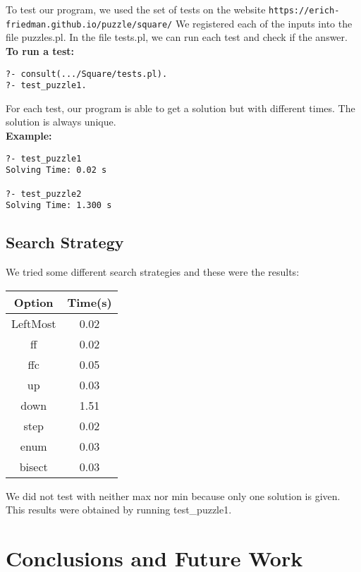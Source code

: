 \documentclass[runningheads]{llncs}
\begin{document}
To test our program, we used the set of tests on the website \texttt{https://erich-friedman.github.io/puzzle/square/} 
We registered each of the inputs into the file puzzles.pl. In the file tests.pl, we can run each test and check if the answer. \\

\textbf{To run a test: }
\begin{verbatim}
?- consult(.../Square/tests.pl).
?- test_puzzle1.
\end{verbatim}

For each test, our program is able to get a solution but with different times. The solution is always unique. \\

\textbf{Example:}
\begin{verbatim}
?- test_puzzle1
Solving Time: 0.02 s

?- test_puzzle2
Solving Time: 1.300 s
\end{verbatim}

\subsection{Search Strategy}

We tried some different search strategies and these were the results:

\begin{center}
 \begin{tabular}{||c c||} 
 \hline
 Option & Time(s) \\ [0.5ex] 
 \hline\hline
 LeftMost & 0.02 \\ 
 \hline
 ff & 0.02 \\
 \hline
 ffc & 0.05  \\
 \hline
 up & 0.03 \\
 \hline
 down & 1.51\\ [1ex] 
 \hline
  step & 0.02 \\ [1ex] 
 \hline
  enum & 0.03  \\ [1ex] 
 \hline
  bisect & 0.03 \\ [1ex]
 \hline
\end{tabular}
\end{center}

We did not test with neither max nor min because only one solution is given.
This results were obtained by running test\_puzzle1.

\section{Conclusions and Future Work}
\end{document}
